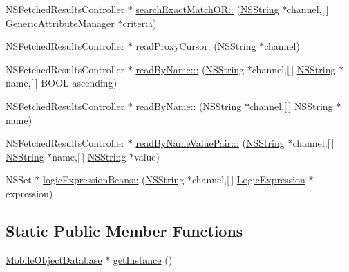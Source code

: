 \begin{DoxyCompactItemize}
\item 
\-N\-S\-Fetched\-Results\-Controller $\ast$ \hyperlink{interface_mobile_object_database_a427dc39763560db3e0454b4f869b7db5}{search\-Exact\-Match\-O\-R\-::} (\hyperlink{class_n_s_string}{\-N\-S\-String} $\ast$channel,\mbox{[}$\,$\mbox{]} \hyperlink{interface_generic_attribute_manager}{\-Generic\-Attribute\-Manager} $\ast$criteria)
\item 
\-N\-S\-Fetched\-Results\-Controller $\ast$ \hyperlink{interface_mobile_object_database_abb4f7fad13bb9a926b4b3e24592cd51f}{read\-Proxy\-Cursor\-:} (\hyperlink{class_n_s_string}{\-N\-S\-String} $\ast$channel)
\item 
\-N\-S\-Fetched\-Results\-Controller $\ast$ \hyperlink{interface_mobile_object_database_af0607b668f81cc5cecc3e0cd4c7945fb}{read\-By\-Name\-:::} (\hyperlink{class_n_s_string}{\-N\-S\-String} $\ast$channel,\mbox{[}$\,$\mbox{]} \hyperlink{class_n_s_string}{\-N\-S\-String} $\ast$name,\mbox{[}$\,$\mbox{]} \-B\-O\-O\-L ascending)
\item 
\-N\-S\-Fetched\-Results\-Controller $\ast$ \hyperlink{interface_mobile_object_database_a483d87e18973500ec8de956d4c1e8e2e}{read\-By\-Name\-::} (\hyperlink{class_n_s_string}{\-N\-S\-String} $\ast$channel,\mbox{[}$\,$\mbox{]} \hyperlink{class_n_s_string}{\-N\-S\-String} $\ast$name)
\item 
\-N\-S\-Fetched\-Results\-Controller $\ast$ \hyperlink{interface_mobile_object_database_a003645b13f7729af95b6d164bacde50d}{read\-By\-Name\-Value\-Pair\-:::} (\hyperlink{class_n_s_string}{\-N\-S\-String} $\ast$channel,\mbox{[}$\,$\mbox{]} \hyperlink{class_n_s_string}{\-N\-S\-String} $\ast$name,\mbox{[}$\,$\mbox{]} \hyperlink{class_n_s_string}{\-N\-S\-String} $\ast$value)
\item 
\-N\-S\-Set $\ast$ \hyperlink{interface_mobile_object_database_abcac5c4b6d52a4652dc0cb34f2e9db15}{logic\-Expression\-Beans\-::} (\hyperlink{class_n_s_string}{\-N\-S\-String} $\ast$channel,\mbox{[}$\,$\mbox{]} \hyperlink{interface_logic_expression}{\-Logic\-Expression} $\ast$expression)
\end{DoxyCompactItemize}
\subsection*{\-Static \-Public \-Member \-Functions}
\begin{DoxyCompactItemize}
\item 
\hyperlink{interface_mobile_object_database}{\-Mobile\-Object\-Database} $\ast$ \hyperlink{interface_mobile_object_database_a036cb43860fccda307c79ed4b1ec73dc}{get\-Instance} ()
\end{DoxyCompactItemize}


